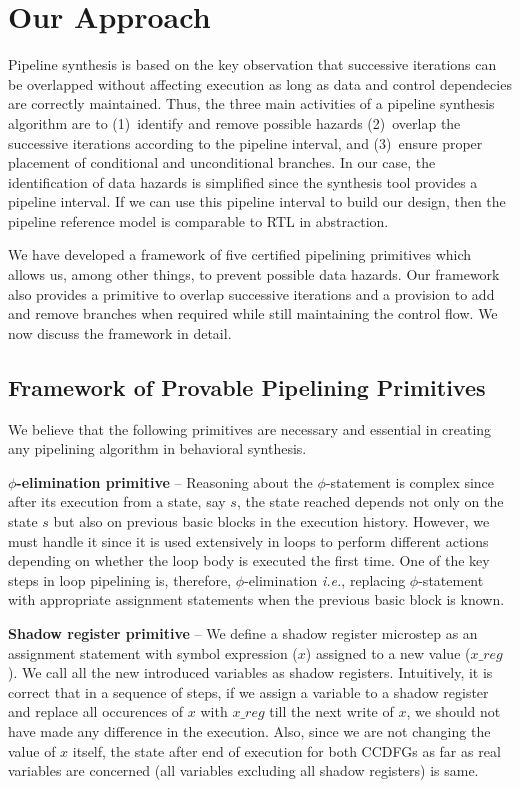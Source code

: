 \section{Our Approach}
\label{sec:pipelining-algorithm}

Pipeline synthesis is based on the key observation that
successive iterations can be overlapped without affecting execution as long
as data and control dependecies are correctly maintained. 
Thus, the three main
activities of a pipeline synthesis algorithm are to
(1)~identify and remove possible hazards (2)~overlap the
successive iterations according to the pipeline interval, and 
(3)~ensure proper placement of conditional and unconditional branches. In our case,
the identification of data hazards is simplified since the synthesis tool
provides a pipeline interval. If we can use this pipeline interval to build our design, 
then the pipeline reference model is comparable to RTL in abstraction. 

We have developed a framework of five certified pipelining
primitives which allows us, among other things, to prevent possible data
hazards. Our framework also provides a primitive
to overlap successive iterations and a provision to add and remove 
branches when required while still maintaining the control flow. We now discuss
the framework in detail.

\subsection{Framework of Provable Pipelining Primitives}

We believe that the following primitives are necessary and essential in creating any pipelining
algorithm in behavioral synthesis.

{\textbf {$\phi$-elimination primitive}} -- 
Reasoning about the $\phi$-statement is complex since after its
execution from a state, say $s$, the state reached depends not only
on the state $s$ but also on previous basic blocks in the execution history.
However, we must handle it since it is used extensively in
loops to perform different actions depending on whether the
loop body is executed the first time. One of the key steps in loop pipelining is,
therefore, $\phi$-elimination {\em i.e.}, replacing
$\phi$-statement with appropriate assignment statements when the previous basic block is known.

{\textbf {Shadow register primitive}} -- We define a shadow register microstep as an assignment
statement with symbol expression ($x$) assigned to a new value ($x\_reg$). We call all the new introduced 
variables as shadow registers. Intuitively, it is correct that in a sequence of steps, if we assign a variable 
to a shadow register and replace all occurences of $x$ with $x\_reg$
till the next write of $x$, we should
not have made any difference in the execution. Also, since we are not changing the value of $x$ itself, 
the state after end of execution for both CCDFGs as far as real variables are concerned (all variables
 excluding all shadow registers) is same. 

